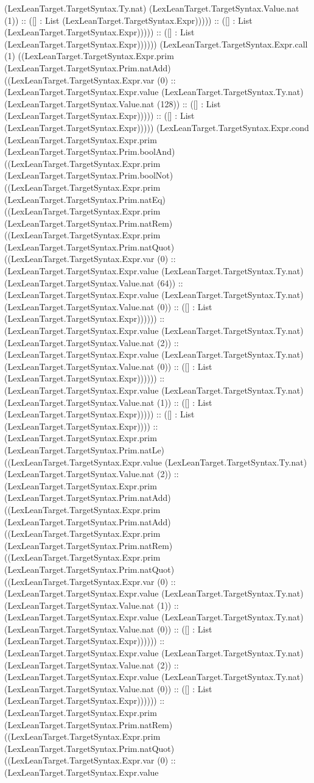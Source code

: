 \documentclass[11pt]{article}
\begin{document}
(LexLeanTarget.TargetSyntax.Ty.nat) (LexLeanTarget.TargetSyntax.Value.nat (1)) :: ([] : List (LexLeanTarget.TargetSyntax.Expr))))) :: ([] : List (LexLeanTarget.TargetSyntax.Expr))))) :: ([] : List (LexLeanTarget.TargetSyntax.Expr)))))) (LexLeanTarget.TargetSyntax.Expr.call (1) ((LexLeanTarget.TargetSyntax.Expr.prim (LexLeanTarget.TargetSyntax.Prim.natAdd) ((LexLeanTarget.TargetSyntax.Expr.var (0) :: (LexLeanTarget.TargetSyntax.Expr.value (LexLeanTarget.TargetSyntax.Ty.nat) (LexLeanTarget.TargetSyntax.Value.nat (128)) :: ([] : List (LexLeanTarget.TargetSyntax.Expr))))) :: ([] : List (LexLeanTarget.TargetSyntax.Expr))))) (LexLeanTarget.TargetSyntax.Expr.cond (LexLeanTarget.TargetSyntax.Expr.prim (LexLeanTarget.TargetSyntax.Prim.boolAnd) ((LexLeanTarget.TargetSyntax.Expr.prim (LexLeanTarget.TargetSyntax.Prim.boolNot) ((LexLeanTarget.TargetSyntax.Expr.prim (LexLeanTarget.TargetSyntax.Prim.natEq) ((LexLeanTarget.TargetSyntax.Expr.prim (LexLeanTarget.TargetSyntax.Prim.natRem) ((LexLeanTarget.TargetSyntax.Expr.prim (LexLeanTarget.TargetSyntax.Prim.natQuot) ((LexLeanTarget.TargetSyntax.Expr.var (0) :: (LexLeanTarget.TargetSyntax.Expr.value (LexLeanTarget.TargetSyntax.Ty.nat) (LexLeanTarget.TargetSyntax.Value.nat (64)) :: (LexLeanTarget.TargetSyntax.Expr.value (LexLeanTarget.TargetSyntax.Ty.nat) (LexLeanTarget.TargetSyntax.Value.nat (0)) :: ([] : List (LexLeanTarget.TargetSyntax.Expr)))))) :: (LexLeanTarget.TargetSyntax.Expr.value (LexLeanTarget.TargetSyntax.Ty.nat) (LexLeanTarget.TargetSyntax.Value.nat (2)) :: (LexLeanTarget.TargetSyntax.Expr.value (LexLeanTarget.TargetSyntax.Ty.nat) (LexLeanTarget.TargetSyntax.Value.nat (0)) :: ([] : List (LexLeanTarget.TargetSyntax.Expr)))))) :: (LexLeanTarget.TargetSyntax.Expr.value (LexLeanTarget.TargetSyntax.Ty.nat) (LexLeanTarget.TargetSyntax.Value.nat (1)) :: ([] : List (LexLeanTarget.TargetSyntax.Expr))))) :: ([] : List (LexLeanTarget.TargetSyntax.Expr)))) :: (LexLeanTarget.TargetSyntax.Expr.prim (LexLeanTarget.TargetSyntax.Prim.natLe) ((LexLeanTarget.TargetSyntax.Expr.value (LexLeanTarget.TargetSyntax.Ty.nat) (LexLeanTarget.TargetSyntax.Value.nat (2)) :: (LexLeanTarget.TargetSyntax.Expr.prim (LexLeanTarget.TargetSyntax.Prim.natAdd) ((LexLeanTarget.TargetSyntax.Expr.prim (LexLeanTarget.TargetSyntax.Prim.natAdd) ((LexLeanTarget.TargetSyntax.Expr.prim (LexLeanTarget.TargetSyntax.Prim.natRem) ((LexLeanTarget.TargetSyntax.Expr.prim (LexLeanTarget.TargetSyntax.Prim.natQuot) ((LexLeanTarget.TargetSyntax.Expr.var (0) :: (LexLeanTarget.TargetSyntax.Expr.value (LexLeanTarget.TargetSyntax.Ty.nat) (LexLeanTarget.TargetSyntax.Value.nat (1)) :: (LexLeanTarget.TargetSyntax.Expr.value (LexLeanTarget.TargetSyntax.Ty.nat) (LexLeanTarget.TargetSyntax.Value.nat (0)) :: ([] : List (LexLeanTarget.TargetSyntax.Expr)))))) :: (LexLeanTarget.TargetSyntax.Expr.value (LexLeanTarget.TargetSyntax.Ty.nat) (LexLeanTarget.TargetSyntax.Value.nat (2)) :: (LexLeanTarget.TargetSyntax.Expr.value (LexLeanTarget.TargetSyntax.Ty.nat) (LexLeanTarget.TargetSyntax.Value.nat (0)) :: ([] : List (LexLeanTarget.TargetSyntax.Expr)))))) :: (LexLeanTarget.TargetSyntax.Expr.prim (LexLeanTarget.TargetSyntax.Prim.natRem) ((LexLeanTarget.TargetSyntax.Expr.prim (LexLeanTarget.TargetSyntax.Prim.natQuot) ((LexLeanTarget.TargetSyntax.Expr.var (0) :: (LexLeanTarget.TargetSyntax.Expr.value 
\end{document}
